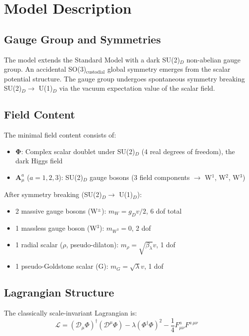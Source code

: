 \documentclass[11pt,a4paper,oneside]{article}
\begin{document}
\section{Model Description}
\label{sec:model}

\subsection{Gauge Group and Symmetries}
The model extends the Standard Model with a dark SU(2)$_D$ non-abelian gauge group. An accidental SO(3)$_{\text{custodial}}$ global symmetry emerges from the scalar potential structure. The gauge group undergoes spontaneous symmetry breaking SU(2)$_D \rightarrow$ U(1)$_D$ via the vacuum expectation value of the scalar field.

\subsection{Field Content}
The minimal field content consists of:
\begin{itemize}
\item $\mathbf{\Phi}$: Complex scalar doublet under SU(2)$_D$ (4 real degrees of freedom), the dark Higgs field
\item $\mathbf{A}^a_\mu$ ($a=1,2,3$): SU(2)$_D$ gauge bosons (3 field components $\rightarrow$ W$^1$, W$^2$, W$^3$)
\end{itemize}

After symmetry breaking (SU(2)$_D \rightarrow$ U(1)$_D$):
\begin{itemize}
\item 2 massive gauge bosons (W$^\pm$): $m_{W} = g_D v / 2$, 6 dof total
\item 1 massless gauge boson (W$^3$): $m_{W^3} = 0$, 2 dof
\item 1 radial scalar ($\rho$, pseudo-dilaton): $m_\rho = \sqrt{\beta_\lambda} v$, 1 dof
\item 1 pseudo-Goldstone scalar (G): $m_G = \sqrt{\lambda} v$, 1 dof
\end{itemize}

\subsection{Lagrangian Structure}
The classically scale-invariant Lagrangian is:
\begin{equation*}
\mathcal{L} = (\mathcal{D}_\mu \Phi)^\dagger (\mathcal{D}^\mu \Phi) - \lambda (\Phi^\dagger \Phi)^2 - \frac{1}{4} F^{a}_{\mu \nu} F^{a\, \mu \nu}
\end{equation*}
\end{document}
